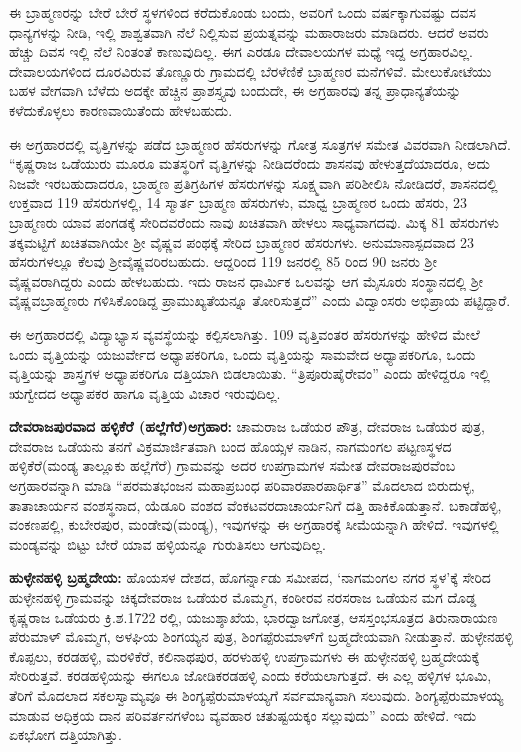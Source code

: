 ಈ ಬ್ರಾಹ್ಮಣರನ್ನು ಬೇರೆ ಬೇರೆ ಸ್ಥಳಗಳಿಂದ ಕರೆದುಕೊಂಡು ಬಂದು, ಅವರಿಗೆ ಒಂದು ವರ್ಷಕ್ಕಾಗುವಷ್ಟು ದವಸ ಧಾನ್ಯಗಳನ್ನು ನೀಡಿ, ಇಲ್ಲಿ ಶಾಶ್ವತವಾಗಿ ನೆಲೆ ನಿಲ್ಲಿಸುವ ಪ್ರಯತ್ನವನ್ನು ಮಹಾರಾಜರು ಮಾಡಿದರು. ಆದರೆ ಅವರು ಹೆಚ್ಚು ದಿವಸ ಇಲ್ಲಿ ನೆಲೆ ನಿಂತಂತೆ ಕಾಣುವುದಿಲ್ಲ. ಈಗ ಎರಡೂ ದೇವಾಲಯಗಳ ಮಧ್ಯೆ ಇದ್ದ ಅಗ್ರಹಾರವಿಲ್ಲ. ದೇವಾಲಯಗಳಿಂದ ದೂರವಿರುವ ತೊಣ್ಣೂರು ಗ್ರಾಮದಲ್ಲಿ ಬೆರಳೆಣಿಕೆ ಬ್ರಾಹ್ಮಣರ ಮನೆಗಳಿವೆ. ಮೇಲುಕೋಟೆಯು ಬಹಳ ವೇಗವಾಗಿ ಬೆಳೆದು ಅದಕ್ಕೇ ಹೆಚ್ಚಿನ ಪ್ರಾಶಸ್ತ್ಯವು ಬಂದುದೇ, ಈ ಅಗ್ರಹಾರವು ತನ್ನ ಪ್ರಾಧಾನ್ಯತೆಯನ್ನು ಕಳೆದುಕೊಳ್ಳಲು ಕಾರಣವಾಯಿತೆಂದು ಹೇಳಬಹುದು.

ಈ ಅಗ್ರಹಾರದಲ್ಲಿ ವೃತ್ತಿಗಳನ್ನು ಪಡೆದ ಬ್ರಾಹ್ಮಣರ ಹೆಸರುಗಳನ್ನು ಗೋತ್ರ ಸೂತ್ರಗಳ ಸಮೇತ ವಿವರವಾಗಿ ನೀಡಲಾಗಿದೆ. “ಕೃಷ್ಣರಾಜ ಒಡೆಯುರು ಮೂರೂ ಮತಸ್ಥರಿಗೆ ವೃತ್ತಿಗಳನ್ನು ನೀಡಿದರೆಂದು ಶಾಸನವು ಹೇಳುತ್ತದೆಯಾದರೂ, ಅದು ನಿಜವೇ ಇರಬಹುದಾದರೂ, ಬ್ರಾಹ್ಮಣ ಪ್ರತಿಗ್ರಹಿಗಳ ಹೆಸರುಗಳನ್ನು ಸೂಕ್ಷ್ಮವಾಗಿ ಪರಿಶೀಲಿಸಿ ನೋಡಿದರೆ, ಶಾಸನದಲ್ಲಿ ಉಕ್ತವಾದ 119 ಹೆಸರುಗಳಲ್ಲಿ, 14 ಸ್ಮಾರ್ತ ಬ್ರಾಹ್ಮಣ ಹೆಸರುಗಳು, ಮಾಧ್ವ ಬ್ರಾಹ್ಮಣರ ಒಂದು ಹೆಸರು, 23 ಬ್ರಾಹ್ಮಣರು ಯಾವ ಪಂಗಡಕ್ಕೆ ಸೇರಿದವರೆಂದು ನಾವು ಖಚಿತವಾಗಿ ಹೇಳಲು ಸಾಧ್ಯವಾಗದವು. ಮಿಕ್ಕ 81 ಹೆಸರುಗಳು ತಕ್ಕಮಟ್ಟಿಗೆ ಖಚಿತವಾಗಿಯೇ ಶ‍್ರೀ ವೈಷ್ಣವ ಪಂಥಕ್ಕೆ ಸೇರಿದ ಬ್ರಾಹ್ಮಣರ ಹೆಸರುಗಳು. ಅನುಮಾನಾಸ್ಪದವಾದ 23 ಹೆಸರುಗಳಲ್ಲೂ ಕೆಲವು ಶ‍್ರೀವೈಷ್ಣವರಿರಬಹುದು. ಆದ್ದರಿಂದ 119 ಜನರಲ್ಲಿ 85 ರಿಂದ 90 ಜನರು ಶ‍್ರೀ ವೈಷ್ಣವರಾಗಿದ್ದರು ಎಂದು ಹೇಳಬಹುದು. ಇದು ರಾಜನ ಧಾರ್ಮಿಕ ಒಲವನ್ನು ಆಗ ಮೈಸೂರು ಸಂಸ್ಥಾನದಲ್ಲಿ ಶ‍್ರೀ ವೈಷ್ಣವಬ್ರಾಹ್ಮಣರು ಗಳಿಸಿಕೊಂಡಿದ್ದ ಪ್ರಾಮುಖ್ಯತೆಯನ್ನೂ ತೋರಿಸುತ್ತದೆ” ಎಂದು ವಿದ್ವಾಂಸರು ಅಭಿಪ್ರಾಯ ಪಟ್ಟಿದ್ದಾರೆ.

ಈ ಅಗ್ರಹಾರದಲ್ಲಿ ವಿದ್ಯಾಭ್ಯಾಸ ವ್ಯವಸ್ಥೆಯನ್ನು ಕಲ್ಪಿಸಲಾಗಿತ್ತು. 109 ವೃತ್ತಿವಂತರ ಹೆಸರುಗಳನ್ನು ಹೇಳಿದ ಮೇಲೆ ಒಂದು ವೃತ್ತಿಯನ್ನು ಯಜುರ್ವೇದ ಅಧ್ಯಾಪಕರಿಗೂ, ಒಂದು ವೃತ್ತಿಯನ್ನು ಸಾಮವೇದ ಅಧ್ಯಾಪಕರಿಗೂ, ಒಂದು ವೃತ್ತಿಯನ್ನು ಶಾಸ್ತ್ರಗಳ ಅಧ್ಯಾಪಕರಿಗೂ ದತ್ತಿಯಾಗಿ ಬಿಡಲಾಯಿತು. “ತ್ರಿಪೂರುಷೈರೇವಂ” ಎಂದು ಹೇಳಿದ್ದರೂ ಇಲ್ಲಿ ಋಗ್ವೇದದ ಅಧ್ಯಾಪಕರ ಹಾಗೂ ವೃತ್ತಿಯ ವಿಚಾರ ಇರುವುದಿಲ್ಲ.

\textbf{ದೇವರಾಜಪುರವಾದ ಹಳ್ಳಿಕೆರೆ (ಹಲ್ಲೆಗೆರೆ)ಅಗ್ರಹಾರ:} ಚಾಮರಾಜ ಒಡೆಯರ ಪೌತ್ರ, ದೇವರಾಜ ಒಡೆಯರ ಪುತ್ರ, ದೇವರಾಜ ಒಡೆಯನು ತನಗೆ ವಿಕ್ರಮಾರ್ಜಿತವಾಗಿ ಬಂದ ಹೊಯ್ಸಳ ನಾಡಿನ, ನಾಗಮಂಗಲ ಪಟ್ಟಣಸ್ಥಳದ ಹಳ್ಳಿಕೆರೆ(ಮಂಡ್ಯ ತಾಲ್ಲೂಕು ಹಲ್ಲೆಗೆರೆ) ಗ್ರಾಮವನ್ನು ಅದರ ಉಪಗ್ರಾಮಗಳ ಸಮೇತ ದೇವರಾಜಪುರವೆಂಬ ಅಗ್ರಹಾರವನ್ನಾಗಿ ಮಾಡಿ “ಪರಮತಭಂಜನ ಮಹಾಪ್ರಬಂಧ ಪರಿವಾರಪಾರಪಾರ್ಥಿತ” ಮೊದಲಾದ ಬಿರುದುಳ್ಳ, ತಾತಾಚಾರ್ಯನ ವಂಶಸ್ಥನಾದ, ಯೆಡೂರಿ ವಂಶದ ವೆಂಕಟವರದಾಚಾರ್ಯನಿಗೆ ದತ್ತಿ ಹಾಕಿಕೊಡುತ್ತಾನೆ. ಬಕಾಡೆಹಳ್ಳಿ, ವಂಕಣಪಲ್ಲಿ, ಕುಬೇರಪುರ, ಮಂಡೇವು(ಮಂಡ್ಯ), ಇವುಗಳನ್ನು ಈ ಅಗ್ರಹಾರಕ್ಕೆ ಸೀಮೆಯನ್ನಾಗಿ ಹೇಳಿದೆ. ಇವುಗಳಲ್ಲಿ ಮಂಡ್ಯವನ್ನು ಬಿಟ್ಟು ಬೇರೆ ಯಾವ ಹಳ್ಳಿಯನ್ನೂ ಗುರುತಿಸಲು ಆಗುವುದಿಲ್ಲ.

\textbf{ಹುಳ್ಳೇನಹಳ್ಳಿ ಬ್ರಹ್ಮದೇಯ:} ಹೊಯಸಳ ದೇಶದ, ಹೊಗರ್ನ್ನಾಡು ಸಮೀಪದ, ‘ನಾಗಮಂಗಲ ನಗರ ಸ್ಥಳ’ಕ್ಕೆ ಸೇರಿದ ಹುಳ್ಳೇನಹಳ್ಳಿ ಗ್ರಾಮವನ್ನು ಚಿಕ್ಕದೇವರಾಜ ಒಡೆಯರ ಮೊಮ್ಮಗ, ಕಂಠೀರವ ನರಸರಾಜ ಒಡೆಯನ ಮಗ ದೊಡ್ಡ ಕೃಷ್ಣರಾಜ ಒಡೆಯರು ಕ್ರಿ.ಶ.1722 ರಲ್ಲಿ, ಯಜುಶ್ಶಾಖೆಯ, ಭಾರದ್ವಾಜಗೋತ್ರ, ಆಸಸ್ತಂಭಸೂತ್ರದ ತಿರುನಾರಾಯಣ ಪೆರುಮಾಳ್​ ಮೊಮ್ಮಗ, ಅಳಘಿಯ ಶಿಂಗಯ್ಯನ ಪುತ್ರ, ಶಿಂಗಪ್ಪೆರುಮಾಳ್​ಗೆ ಬ್ರಹ್ಮದೇಯವಾಗಿ ನೀಡುತ್ತಾನೆ. ಹುಳ್ಳೇನಹಳ್ಳಿ ಕೊಪ್ಪಲು, ಕರಡಹಳ್ಳಿ, ಮರಳಿಕೆರೆ, ಕಲಿನಾಥಪುರ, ಹರಳುಹಳ್ಳಿ ಉಪಗ್ರಾಮಗಳು ಈ ಹುಳ್ಳೇನಹಳ್ಳಿ ಬ್ರಹ್ಮದೇಯಕ್ಕೆ ಸೇರಿರುತ್ತವೆ. ಕರಡಹಳ್ಳಿಯನ್ನು ಈಗಲೂ ಜೋಡಿಕರಡಹಳ್ಳಿ ಎಂದು ಕರೆಯಲಾಗುತ್ತದೆ. ಈ ಎಲ್ಲ ಹಳ್ಳಿಗಳ ಭೂಮಿ, ತೆರಿಗೆ ಮೊದಲಾದ ಸಕಲಸ್ವಾಮ್ಯವೂ ಈ ಶಿಂಗ್ಯಪ್ಪೆರುಮಾಳಯ್ಯಗೆ ಸರ್ವಮಾನ್ಯವಾಗಿ ಸಲುವುದು. ಶಿಂಗ್ಯಪ್ಪೆರುಮಾಳಯ್ಯ ಮಾಡುವ ಅಧಿಕ್ರಯ ದಾನ ಪರಿವರ್ತನಗಳೆಂಬ ವ್ಯವಹಾರ ಚತುಷ್ಟಯಕ್ಕಂ ಸಲ್ಲುವುದು” ಎಂದು ಹೇಳಿದೆ. ಇದು ಏಕಭೋಗ ದತ್ತಿಯಾಗಿತ್ತು. 


